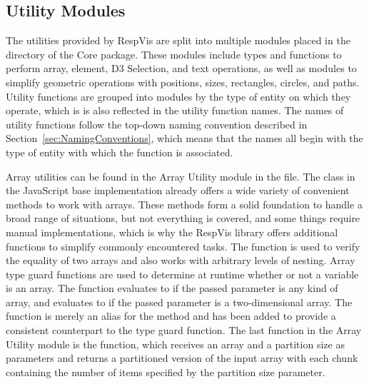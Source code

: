 \subsection{Utility Modules}

The utilities provided by RespVis are split into multiple modules
placed in the  directory of the Core
package. These modules include types and functions to perform array,
element, D3 Selection, and text operations, as well as modules to
simplify geometric operations with positions, sizes, rectangles,
circles, and paths. Utility functions are grouped into modules by the
type of entity on which they operate, which is is also reflected in
the utility function names. The names of utility functions follow the
top-down naming convention described in
Section~\ref{sec:NamingConventions}, which means that the names all
begin with the type of entity with which the function is associated.

Array utilities can be found in the Array Utility module in
the  file. The  class in the
JavaScript base implementation already offers a wide variety of
convenient methods to work with arrays. These methods form a solid
foundation to handle a broad range of situations, but not everything
is covered, and some things require manual implementations, which is
why the RespVis library offers additional functions to simplify
commonly encountered tasks. The  function is used to
verify the equality of two arrays and also works with arbitrary levels
of nesting. Array type guard functions are used to determine at
runtime whether or not a variable is an array. The function
 evaluates to  if the passed parameter is any
kind of array, and  evaluates to  if the
passed parameter is a two-dimensional array. The 
function is merely an alias for the  method and
has been added to provide a consistent counterpart to the
 type guard function. The last function in the
Array Utility module is the  function,
which receives an array and a partition size as parameters and returns
a partitioned version of the input array with each chunk containing
the number of items specified by the partition size parameter.



